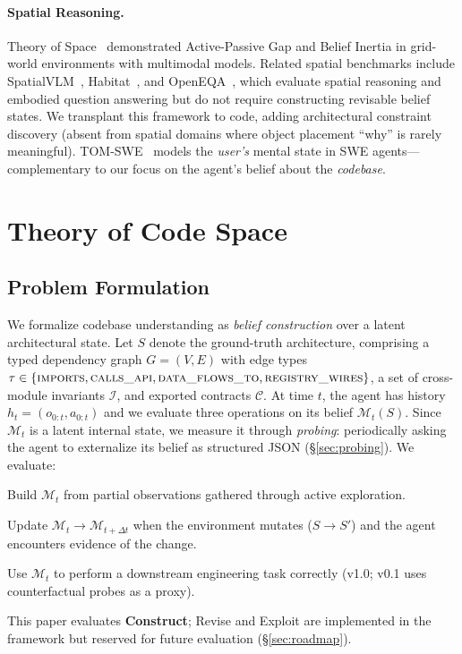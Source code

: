 \documentclass{article}
\begin{document}
\paragraph{Spatial Reasoning.}
Theory of Space~\citep{zhang2026theoryofspace} demonstrated Active-Passive Gap and Belief Inertia in grid-world environments with multimodal models. Related spatial benchmarks include SpatialVLM~\citep{spatialvlm2024}, Habitat~\citep{habitat2019}, and OpenEQA~\citep{openeqa2024}, which evaluate spatial reasoning and embodied question answering but do not require constructing revisable belief states. We transplant this framework to code, adding architectural constraint discovery (absent from spatial domains where object placement ``why'' is rarely meaningful). TOM-SWE~\citep{zhou2025tomswe} models the \emph{user's} mental state in SWE agents---complementary to our focus on the agent's belief about the \emph{codebase}.

\section{Theory of Code Space}
\label{sec:benchmark}

\subsection{Problem Formulation}

We formalize codebase understanding as \emph{belief construction} over a latent architectural state. Let $S$ denote the ground-truth architecture, comprising a typed dependency graph $G = (V, E)$ with edge types $\tau \in \{\textsc{imports}, \textsc{calls\_api}, \textsc{data\_flows\_to}, \textsc{registry\_wires}\}$, a set of cross-module invariants $\mathcal{I}$, and exported contracts $\mathcal{C}$. At time $t$, the agent has history $h_t = (o_{0:t}, a_{0:t})$ and we evaluate three operations on its belief $\mathcal{M}_t(S)$.  Since $\mathcal{M}_t$ is a latent internal state, we measure it through \emph{probing}: periodically asking the agent to externalize its belief as structured JSON (\S\ref{sec:probing}). We evaluate:

\begin{description}[nosep]
    \item[Construct] Build $\mathcal{M}_t$ from partial observations gathered through active exploration.
    \item[Revise] Update $\mathcal{M}_t \to \mathcal{M}_{t+\Delta t}$ when the environment mutates ($S \to S'$) and the agent encounters evidence of the change.
    \item[Exploit] Use $\mathcal{M}_t$ to perform a downstream engineering task correctly (v1.0; v0.1 uses counterfactual probes as a proxy).
\end{description}
\noindent This paper evaluates \textbf{Construct}; Revise and Exploit are implemented in the framework but reserved for future evaluation (\S\ref{sec:roadmap}).
\end{document}
